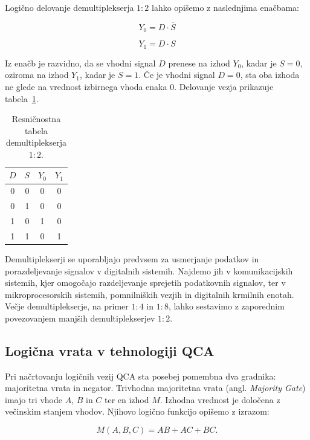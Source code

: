 Logično delovanje demultiplekserja $1:2$ lahko opišemo z naslednjima enačbama:

\begin{equation}
Y_0 = D \cdot \overline{S}
\end{equation}

\begin{equation}
Y_1 = D \cdot S
\end{equation}

Iz enačb je razvidno, da se vhodni signal $D$ prenese na izhod $Y_0$, kadar je $S=0$, oziroma na izhod $Y_1$, kadar je $S=1$. Če je vhodni signal $D=0$, sta oba izhoda ne glede na vrednost izbirnega vhoda enaka 0. Delovanje vezja prikazuje tabela~\ref{tab:demux}.

\begin{table}[h]
\centering
\caption{Resničnostna tabela demultiplekserja $1:2$.}
\label{tab:demux}
\begin{tabular}{c|c|c|c}
$D$ & $S$ & $Y_0$ & $Y_1$ \\
\hline
0 & 0 & 0 & 0 \\
0 & 1 & 0 & 0 \\
1 & 0 & 1 & 0 \\
1 & 1 & 0 & 1 \\
\end{tabular}
\end{table}

Demultiplekserji se uporabljajo predvsem za usmerjanje podatkov in porazdeljevanje signalov v digitalnih sistemih. Najdemo jih v komunikacijskih sistemih, kjer omogočajo razdeljevanje sprejetih podatkovnih signalov, ter v mikroprocesorskih sistemih, pomnilniških vezjih in digitalnih krmilnih enotah. Večje demultiplekserje, na primer $1:4$ in $1:8$, lahko sestavimo z zaporednim povezovanjem manjših demultiplekserjev $1:2$.

\subsection{Logična vrata v tehnologiji QCA}

Pri načrtovanju logičnih vezij QCA sta posebej pomembna dva gradnika: majoritetna vrata in negator. Trivhodna majoritetna vrata (angl. \textit{Majority Gate}) imajo tri vhode $A$, $B$ in $C$ ter en izhod $M$. Izhodna vrednost je določena z večinskim stanjem vhodov. Njihovo logično funkcijo opišemo z izrazom:

\begin{equation}
M(A,B,C)=AB+AC+BC.
\end{equation}

